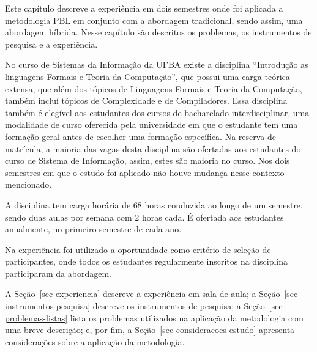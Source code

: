
\label{cap-estudo}
\acresetall
Este capítulo descreve a experiência em dois semestres onde foi aplicada a metodologia \ac{PBL}
em conjunto com a abordagem tradicional, sendo assim, uma abordagem híbrida.
Nesse capítulo são descritos os problemas, os instrumentos de pesquisa e a
experiência.

No curso de Sistemas da Informação da \ac{UFBA} existe
a disciplina ``Introdução as linguagens Formais e Teoria da Computação'',
que possui uma carga teórica extensa, que além dos tópicos de Linguagens Formais e Teoria
da Computação, também incluí tópicos de Complexidade e de Compiladores.
Essa disciplina também é elegível aos estudantes dos cursos de bacharelado
interdisciplinar, uma modalidade de curso oferecida pela universidade
em que o estudante tem uma formação geral antes de escolher
uma formação específica.
Na reserva de matrícula, a maioria das vagas desta disciplina são ofertadas aos
estudantes do curso de Sistema de Informação, assim, estes são maioria no curso.
Nos dois semestres em que o estudo foi aplicado não houve mudança nesse
contexto mencionado.

A disciplina tem carga horária de 68 horas conduzida ao longo de um semestre, sendo duas
aulas por semana com 2 horas cada.
É ofertada aos estudantes anualmente, no primeiro semestre de cada ano.

Na experiência foi utilizado a oportunidade como critério de seleção de participantes, onde todos os
estudantes regularmente inscritos na disciplina participaram da abordagem.

A Seção~\ref{sec-experiencia} descreve a experiência em sala de aula;
a Seção~\ref{sec-instrumentos-pesquisa} descreve os instrumentos de pesquisa;
a Seção~\ref{sec-problemas-listas} lista os problemas utilizados
na aplicação da metodologia com uma breve
descrição;
e, por fim, a Seção~\ref{sec-consideracoes-estudo} apresenta
considerações sobre a aplicação da metodologia.





